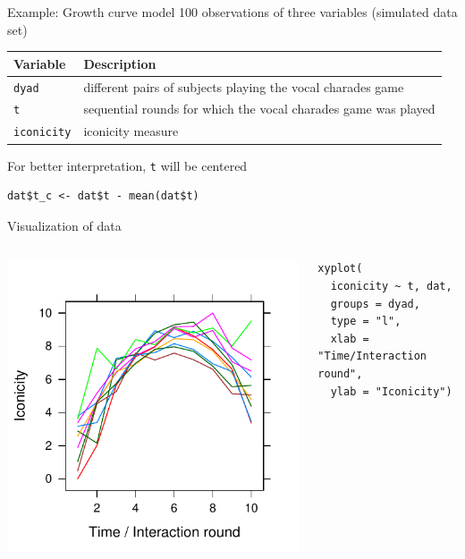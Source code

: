 \documentclass[aspectratio=169]{beamer}
\begin{document}
\begin{frame}[fragile]{Example: Growth curve model}
100 observations of three variables (simulated data set)\\[2ex]
  \begin{tabular}{lp{8cm}}
      Variable & Description \\
    \hline
      \texttt{dyad} & different pairs of subjects playing the vocal charades game\\
      \texttt{t} & sequential rounds for which the vocal charades game was played \\
      \texttt{iconicity} & iconicity measure \\
     \hline
  \end{tabular}

  \vspace{1cm}
  For better interpretation, \texttt{t} will be centered
  \begin{lstlisting}
dat$t_c <- dat$t - mean(dat$t)
  \end{lstlisting}
\end{frame}

\begin{frame}[fragile]{Visualization of data}
  \begin{columns}
    \begin{column}{.5\textwidth}
      \includegraphics[scale=.8]{../figures/icon}
    \end{column}
    \begin{column}{.5\textwidth}
      \begin{lstlisting}
xyplot(
  iconicity ~ t, dat,
  groups = dyad,
  type = "l",
  xlab = "Time/Interaction round",
  ylab = "Iconicity")
      \end{lstlisting}
    \end{column}
  \end{columns}
\end{frame}
\end{document}
